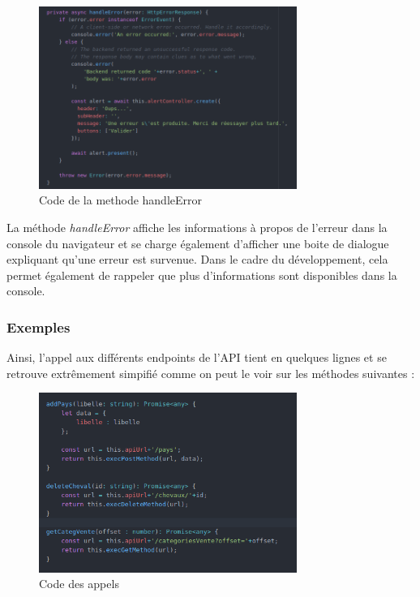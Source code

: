 				\begin{figure}[H]
					\centering\includegraphics[width=0.75\textwidth, keepaspectratio]{res/ionic-rest-error.png}
					\caption{Code de la methode handleError}
				\end{figure}

				\noindent
				La méthode \textit{handleError} affiche les informations à propos de l'erreur dans la console du navigateur et se charge également d'afficher une boite de dialogue expliquant qu'une erreur est survenue. Dans le cadre du développement, cela permet également de rappeler que plus d'informations sont disponibles dans la console.

			\newpage
			\subsubsection{Exemples}

			Ainsi, l'appel aux différents endpoints de l'API tient en quelques lignes et se retrouve extrêmement simpifié comme on peut le voir sur les méthodes suivantes :

				\begin{figure}[H]
					\centering\includegraphics[width=0.75\textwidth, keepaspectratio]{res/ionic-rest-add-delete-get.png}
					\caption{Code des appels}
				\end{figure}

